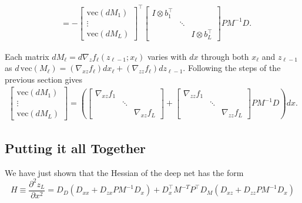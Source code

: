 \documentclass{article}
\begin{document}
\begin{align}
      & = -\begin{bmatrix}
               \mathrm{vec} \left(dM_1\right) \\
               \vdots                         \\
               \mathrm{vec} \left(dM_L\right)
           \end{bmatrix}
    ^\top
    \begin{bmatrix}
        I \otimes b_1^\top \\ &\ddots  \\ && I \otimes b_L^\top
    \end{bmatrix}
    PM^{-1} D.
\end{align}

Each matrix $dM_\ell = d \nabla_z f_\ell(z_{\ell-1}; x_\ell)$ varies with $dx$
through both $x_\ell$ and $z_{\ell -1}$ as $d\,\mathrm{vec} \left(M_\ell\right)
    = \left(\nabla_{xz} f_\ell\right) dx_\ell + \left(\nabla_{zz} f_\ell\right)
    dz_{\ell-1}$. Following the steps of the previous section gives
\begin{align}
    \begin{bmatrix}
        \mathrm{vec}\left(dM_1\right) \\
        \vdots                        \\
        \mathrm{vec}\left(dM_L\right)
    \end{bmatrix}
    =
    \left(
    \begin{bmatrix}
        \nabla_{xz} f_1 &        &                 \\
                        & \ddots &                 \\
                        &        & \nabla_{xz} f_L
    \end{bmatrix}
    +
    \begin{bmatrix}
        \nabla_{zz} f_1 \\ &\ddots& \\ && \nabla_{zz} f_L
    \end{bmatrix}
    P M^{-1} D
    \right)dx.
\end{align}

\subsection{Putting it all Together}

We have just shown that the Hessian of the deep net has the form
\begin{equation}
    H \equiv \frac{\partial^2 z_L}{\partial x^2}
    = D_D \left(D_{xx} + D_{zx} PM^{-1} D_x\right) + D_x^\top M^{-T}P^\top D_M \left(D_{xz}+D_{zz}P M^{-1}D_x\right)
\end{equation}
\end{document}
